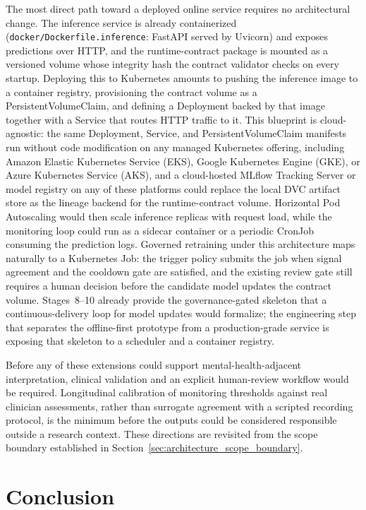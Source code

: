 The most direct path toward a deployed online service requires no architectural change. The inference service is already containerized (\texttt{docker/Dockerfile.inference}: FastAPI served by Uvicorn) and exposes predictions over HTTP, and the runtime-contract package is mounted as a versioned volume whose integrity hash the contract validator checks on every startup. Deploying this to Kubernetes amounts to pushing the inference image to a container registry, provisioning the contract volume as a PersistentVolumeClaim, and defining a Deployment backed by that image together with a Service that routes HTTP traffic to it. This blueprint is cloud-agnostic: the same Deployment, Service, and PersistentVolumeClaim manifests run without code modification on any managed Kubernetes offering, including Amazon Elastic Kubernetes Service (EKS), Google Kubernetes Engine (GKE), or Azure Kubernetes Service (AKS), and a cloud-hosted MLflow Tracking Server or model registry on any of these platforms could replace the local DVC artifact store as the lineage backend for the runtime-contract volume. Horizontal Pod Autoscaling would then scale inference replicas with request load, while the monitoring loop could run as a sidecar container or a periodic CronJob consuming the prediction logs. Governed retraining under this architecture maps naturally to a Kubernetes Job: the trigger policy submits the job when signal agreement and the cooldown gate are satisfied, and the existing review gate still requires a human decision before the candidate model updates the contract volume. Stages~8--10 already provide the governance-gated skeleton that a continuous-delivery loop for model updates would formalize; the engineering step that separates the offline-first prototype from a production-grade service is exposing that skeleton to a scheduler and a container registry.

Before any of these extensions could support mental-health-adjacent interpretation, clinical validation and an explicit human-review workflow would be required. Longitudinal calibration of monitoring thresholds against real clinician assessments, rather than surrogate agreement with a scripted recording protocol, is the minimum before the outputs could be considered responsible outside a research context. These directions are revisited from the scope boundary established in Section~\ref{sec:architecture_scope_boundary}.

\section{Conclusion}
\label{sec:ch8_conclusion}

